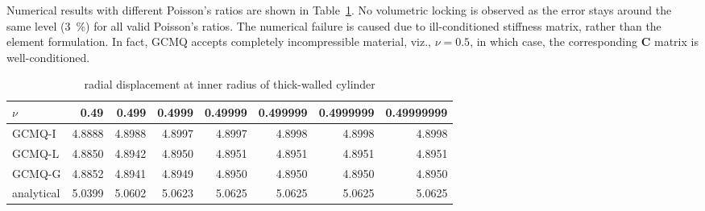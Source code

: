 \documentclass[3p,sort&compress,review,11pt]{elsarticle}
\newcommand*{\tabref}[1]{Table~\ref{#1}}
\begin{document}
Numerical results with different Poisson's ratios are shown in \tabref{tab:cylinder}. No volumetric locking is observed as the error stays around the same level (\SI{3}{\percent}) for all valid Poisson's ratios. The numerical failure is caused due to ill-conditioned stiffness matrix, rather than the element formulation. In fact, GCMQ accepts completely incompressible material, viz., $\nu=0.5$, in which case, the corresponding $\mathbold{C}$ matrix is well-conditioned.
\begin{table}[htb]
\centering\footnotesize
\caption{radial displacement at inner radius of thick-walled cylinder}\label{tab:cylinder}
\begin{tabular}{lrrrrrrr}
	\toprule
	$\nu$      &   0.49 &  0.499 & 0.4999 & 0.49999 & 0.499999 & 0.4999999 & 0.49999999 \\ \midrule
	GCMQ-I     & 4.8888 & 4.8988 & 4.8997 &  4.8997 &   4.8998 &    4.8998 &     4.8998 \\
	GCMQ-L     & 4.8850 & 4.8942 & 4.8950 &  4.8951 &   4.8951 &    4.8951 &     4.8951 \\
	GCMQ-G     & 4.8852 & 4.8941 & 4.8949 &  4.8950 &   4.8950 &    4.8950 &     4.8950 \\
	analytical & 5.0399 & 5.0602 & 5.0623 &  5.0625 &   5.0625 &    5.0625 &     5.0625 \\ \bottomrule
\end{tabular}
\end{table}
\end{document}
